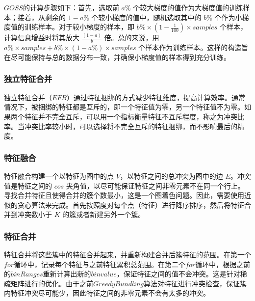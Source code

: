 \documentclass[withoutpreface,bwprint]{cumcmthesis}
\begin{document}
\(GOSS\)的计算步骤如下：首先，选取前 \( a \% \) 个较大梯度的值作为大梯度值的训练样本；接着，从剩余的 \( 1 - a \% \) 个较小梯度的值中，随机选取其中的 \( b \% \) 个作为小梯度值的训练样本。对于较小梯度的样本，即 \( b \% \times (1 - \frac{1}{100}) \times samples \) 个样本，计算信息增益时将其放大 \( \frac{(1 - a)}{b} \) 倍。总的来说，用 \( a \% \times samples + b \% \times (1 - a \%) \times samples \) 个样本作为训练样本。这样的构造旨在尽可能保持与总的数据分布一致，并确保小梯度值的样本得到充分训练。


\subsubsection{独立特征合并}

独立特征合并（\(EFB\)）通过特征捆绑的方式减少特征维度，提高计算效率。通常情况下，被捆绑的特征都是互斥的，即一个特征值为零，另一个特征值不为零。如果两个特征并不完全互斥，可以用一个指标衡量特征不互斥程度，称之为冲突比率。当冲突比率较小时，可以选择将不完全互斥的特征捆绑，而不影响最后的精度。


\subsubsection{特征融合}

特征融合构建一个以特征为图中的点 \( V \)，以特征之间的总冲突为图中的边 \( E \)。冲突值是特征之间的 \(cos\) 夹角值，以尽可能保证特征之间非零元素不在同一个行上。寻找合并特征且使得合并的簇个数最小，这是一个图着色问题。因此，需要使用近似的贪心算法来完成。首先按照度对每个点（特征）进行降序排序，然后将特征合并到冲突数小于 \( K \) 的簇或者新建另外一个簇。


\subsubsection{特征合并}

特征合并将这些簇中的特征合并起来，并重新构建合并后簇特征的范围。在第一个\(for\)循环中，记录每个特征与之前特征累积总范围。在第二个\(for\)循环中，根据之前的\(bin Ranges\)重新计算出新的\(bin value\)，保证特征之间的值不会冲突。这是针对稀疏矩阵进行的优化。由于之前\(Greedy Bundling\)算法对特征进行冲突检查，保证簇内特征冲突尽可能少，因此特征之间的非零元素不会有太多的冲突。
\end{document}
